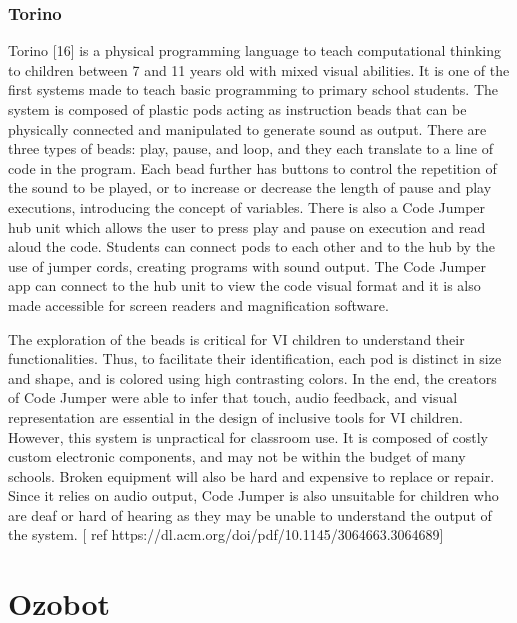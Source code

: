 \documentclass[oneside,%
                    author={Malak Hajji},
                    degree={BSc},
                    title={Designing An Accessible Computational Toolkit For Students},
                  subtitle={With Mixed Visual Abilities}]{dissertation}
\begin{document}
\subsubsection{Torino}
Torino [16] is a physical programming language to teach computational thinking to children between 7 and 11 years old with mixed visual abilities. It is one of the first systems made to teach basic programming to primary school students. The system is composed of plastic pods acting as instruction beads that can be physically connected and manipulated to generate sound as output. There are three types of beads: play, pause, and loop, and they each translate to a line of code in the program. Each bead further has buttons to control the repetition of the sound to be played, or to increase or decrease the length of pause and play executions, introducing the concept of variables. There is also a Code Jumper hub unit which allows the user to press play and pause on execution and read aloud the code. Students can connect pods to each other and to the hub by the use of jumper cords, creating programs with sound output. The Code Jumper app can connect to the hub unit to view the code visual format and it is also made accessible for screen readers and magnification software.  

The exploration of the beads is  critical for VI children to understand their functionalities. Thus, to facilitate their identification, each pod is distinct in size and shape, and is colored using high contrasting colors. In the end, the creators of Code Jumper were able to infer that touch, audio feedback, and visual representation are essential in the design of inclusive tools for VI children.
However, this system is unpractical for classroom use. It is composed of costly custom electronic components, and may not be within the budget of many schools. Broken equipment will also be hard and expensive to replace or repair. Since it relies on audio output, Code Jumper is also unsuitable for children who are deaf or hard of hearing as they may be unable to understand the output of the system. [ ref https://dl.acm.org/doi/pdf/10.1145/3064663.3064689]

\subsubsection{}


\section{Ozobot}
\end{document}
